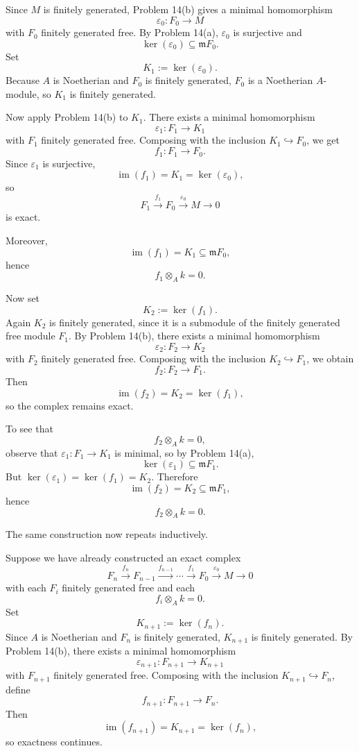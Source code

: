 \documentclass[12pt,a4paper]{article}
\theoremstyle{notespace}
\begin{document}
\medskip

Since \(M\) is finitely generated, Problem 14(b) gives a minimal homomorphism
\[
\varepsilon_0:F_0\to M
\]
with \(F_0\) finitely generated free. By Problem 14(a), \(\varepsilon_0\) is surjective and
\[
\ker(\varepsilon_0)\subseteq \mathfrak m F_0.
\]
Set
\[
K_1:=\ker(\varepsilon_0).
\]
Because \(A\) is Noetherian and \(F_0\) is finitely generated, \(F_0\) is a Noetherian \(A\)-module, so \(K_1\) is finitely generated.

Now apply Problem 14(b) to \(K_1\). There exists a minimal homomorphism
\[
\varepsilon_1:F_1\to K_1
\]
with \(F_1\) finitely generated free. Composing with the inclusion \(K_1\hookrightarrow F_0\), we get
\[
f_1:F_1\to F_0.
\]
Since \(\varepsilon_1\) is surjective,
\[
\operatorname{im}(f_1)=K_1=\ker(\varepsilon_0),
\]
so
\[
F_1\xrightarrow{f_1}F_0\xrightarrow{\varepsilon_0}M\to 0
\]
is exact.

Moreover,
\[
\operatorname{im}(f_1)=K_1\subseteq \mathfrak m F_0,
\]
hence
\[
f_1\otimes_A k=0.
\]

Now set
\[
K_2:=\ker(f_1).
\]
Again \(K_2\) is finitely generated, since it is a submodule of the finitely generated free module \(F_1\). By Problem 14(b), there exists a minimal homomorphism
\[
\varepsilon_2:F_2\to K_2
\]
with \(F_2\) finitely generated free. Composing with the inclusion \(K_2\hookrightarrow F_1\), we obtain
\[
f_2:F_2\to F_1.
\]
Then
\[
\operatorname{im}(f_2)=K_2=\ker(f_1),
\]
so the complex remains exact.

To see that
\[
f_2\otimes_A k=0,
\]
observe that \(\varepsilon_1:F_1\to K_1\) is minimal, so by Problem 14(a),
\[
\ker(\varepsilon_1)\subseteq \mathfrak m F_1.
\]
But \(\ker(\varepsilon_1)=\ker(f_1)=K_2\). Therefore
\[
\operatorname{im}(f_2)=K_2\subseteq \mathfrak m F_1,
\]
hence
\[
f_2\otimes_A k=0.
\]

The same construction now repeats inductively.

Suppose we have already constructed an exact complex
\[
F_n\xrightarrow{f_n}F_{n-1}\xrightarrow{f_{n-1}}\cdots\xrightarrow{f_1}F_0\xrightarrow{\varepsilon_0}M\to 0
\]
with each \(F_i\) finitely generated free and each
\[
f_i\otimes_A k=0.
\]
Set
\[
K_{n+1}:=\ker(f_n).
\]
Since \(A\) is Noetherian and \(F_n\) is finitely generated, \(K_{n+1}\) is finitely generated. By Problem 14(b), there exists a minimal homomorphism
\[
\varepsilon_{n+1}:F_{n+1}\to K_{n+1}
\]
with \(F_{n+1}\) finitely generated free. Composing with the inclusion \(K_{n+1}\hookrightarrow F_n\), define
\[
f_{n+1}:F_{n+1}\to F_n.
\]
Then
\[
\operatorname{im}(f_{n+1})=K_{n+1}=\ker(f_n),
\]
so exactness continues.
\end{document}
